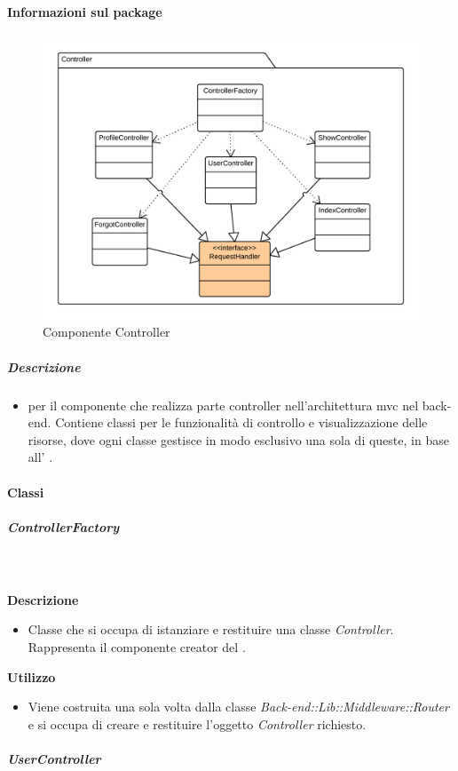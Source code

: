   \paragraph{Informazioni sul package} 
    \begin{figure}[H] 
      \begin{center} 
        \includegraphics[width=\textwidth]{uml/package/Back-end::Lib::Controller::Controller.png}  
        \caption{Componente Controller}
      \end{center}  
    \end{figure} 
  \subparagraph{Descrizione} 
    \begin{itemize}
    \item[]  per il componente che realizza parte controller nell’architettura mvc nel back-
end. Contiene classi per le funzionalità di controllo e visualizzazione delle risorse, dove ogni
classe gestisce in modo esclusivo una sola di queste, in base all’  .

    \end{itemize} 
    \paragraph{Classi}
      \subparagraph{ControllerFactory}
        
        \textbf{\\ \\ Descrizione} 
          \begin{itemize}
            \item[] Classe che si occupa di istanziare e restituire una classe \textit{Controller}. Rappresenta il componente creator del  .
          \end{itemize}      
        \textbf{Utilizzo}  
          \begin{itemize}
            \item[] Viene costruita una sola volta dalla classe \textit{Back-end::Lib::Middleware::Router} e si occupa di creare e restituire l'oggetto \textit{Controller} richiesto.
          \end{itemize}
      \subparagraph{UserController}
        
